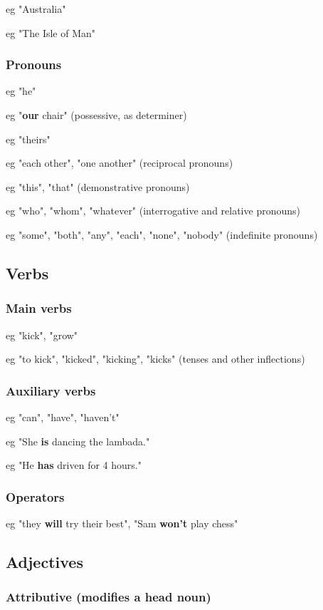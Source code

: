 eg "Australia"

eg "The Isle of Man"

\subsubsection{Pronouns}

eg "he"

eg "\textbf{our} chair" (possessive, as determiner)

eg "theirs"

eg "each other", "one another" (reciprocal pronouns)

eg "this", "that" (demonstrative pronouns)

eg "who", "whom", "whatever" (interrogative and relative pronouns)

eg "some", "both", "any", "each", "none", "nobody" (indefinite pronouns)

\subsection{Verbs}

\subsubsection{Main verbs}

eg "kick", "grow"

eg "to kick", "kicked", "kicking", "kicks" (tenses and other inflections)

\subsubsection{Auxiliary verbs}

eg "can", "have", "haven't"

eg "She \textbf{is} dancing the lambada."

eg "He \textbf{has} driven for 4 hours."

\subsubsection{Operators}

eg "they \textbf{will} try their best", "Sam \textbf{won't} play chess"

\subsection{Adjectives}

\subsubsection{Attributive (modifies a head noun)}

